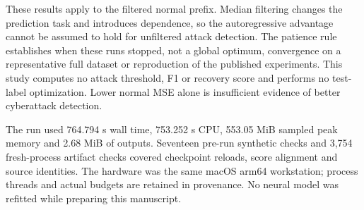 These results apply to the filtered normal prefix. Median filtering changes the prediction task and introduces dependence, so the autoregressive advantage cannot be assumed to hold for unfiltered attack detection. The patience rule establishes when these runs stopped, not a global optimum, convergence on a representative full dataset or reproduction of the published experiments. This study computes no attack threshold, F1 or recovery score and performs no test-label optimization. Lower normal MSE alone is insufficient evidence of better cyberattack detection.

The run used 764.794 s wall time, 753.252 s CPU, 553.05 MiB sampled peak memory and 2.68 MiB of outputs. Seventeen pre-run synthetic checks and 3,754 fresh-process artifact checks covered checkpoint reloads, score alignment and source identities. The hardware was the same macOS arm64 workstation; process threads and actual budgets are retained in provenance. No neural model was refitted while preparing this manuscript.
